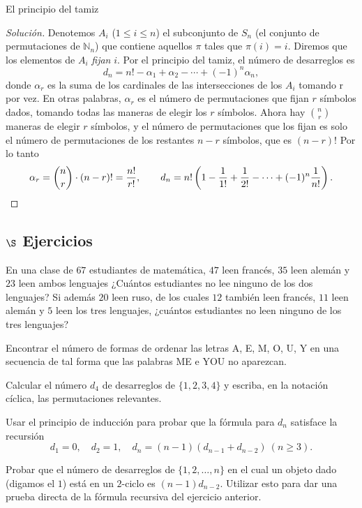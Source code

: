 \begin{section}{El principio del tamiz}
\begin{proof}[Solución]
Denotemos $A_i$ ($1 \le i \le n$) el subconjunto de $S_n$ (el conjunto de permutaciones de $\mathbb N_n$) que contiene aquellos $\pi$ tales que $\pi(i)=i$. Diremos que los elementos de $A_i$ \textit{fijan} $i$. Por el principio del tamiz, el número de desarreglos es 
$$
d_n= n! -\alpha_1+\alpha_2 - \cdots +(-1)^n\alpha_n,
$$
donde $\alpha_r$ es la suma de los cardinales de las intersecciones de los $A_i$ tomando r por vez. En otras palabras, $\alpha_r$ es el número de permutaciones que fijan $r$ símbolos dados, tomando todas las maneras de elegir los $r$ símbolos. Ahora hay $\binom{n}{r} $ maneras de elegir $r$ símbolos, y el número de  permutaciones que los fijan es solo el número de permutaciones de los restantes $n-r$ símbolos, que es $(n-r)!$  Por lo tanto
$$
\alpha_r = \binom{n}{r} \cdot (n-r)! = \frac{n!}{r!},\qquad d_n=
n!\left(1-\frac{1}{1!} + \frac{1}{2!}-\cdots
+(-1)^n\frac{1}{n!}\right). \nopagebreak$$
\end{proof}

\subsection*{$\S$ Ejercicios}
\begin{enumex}
\item En una clase de $67$ estudiantes de matemática, $47$ leen francés, $35$ leen alemán y $23$ leen ambos lenguajes ¿Cuántos estudiantes no lee ninguno de los dos lenguajes? Si además $20$ leen ruso, de los
cuales $12$ también leen francés, $11$ leen alemán y $5$ leen los tres lenguajes, ¿cuántos estudiantes no leen ninguno de los tres lenguajes?

\item Encontrar el número de formas de ordenar las letras A, E, M, O, U, Y en una secuencia de tal forma que las palabras ME e YOU no aparezcan. 

\item
Calcular el número $d_4$ de desarreglos de $\{1,2,3,4\}$ y escriba, en la notación cíclica, las permutaciones relevantes.

\item Usar el principio de inducción para probar que la fórmula para $d_n$ satisface la recursión
$$
d_1=0, \quad d_2=1,\quad d_n= (n-1)(d_{n-1}+d_{n-2}) \ (n\ge 3).
$$

\item Probar que el número de desarreglos de $\{1,2,\ldots,n\}$ en el cual un objeto dado (digamos el $1$) está en un $2$-ciclo es $(n-1)d_{n-2}$. Utilizar esto para dar una prueba directa de la fórmula recursiva del ejercicio anterior.
\end{enumex}

\end{section}


